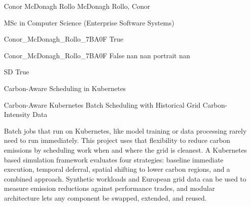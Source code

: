 
\begingroup{}\relax



\def\Key{Conor_McDonagh_Rollo_7BA0F}

{Conor McDonagh Rollo}
{McDonagh Rollo, Conor}

{MSc in Computer Science (Enterprise Software Systems)}

{Conor_McDonagh_Rollo_7BA0F}
{True}

{Conor_McDonagh_Rollo_7BA0F}
{False}
{nan}
{nan}
{portrait}
{nan}

{SD}
{True}

{Carbon-Aware Scheduling in Kubernetes}

{Carbon-Aware Kubernetes Batch Scheduling with Historical Grid Carbon-Intensity Data}

{Batch jobs that run on Kubernetes, like model training or data processing rarely need to run immediately. This project uses that flexibility to reduce carbon emissions by scheduling work when and where the grid is cleanest. A Kubernetes based simulation framework evaluates four strategies: baseline immediate execution, temporal deferral, spatial shifting to lower carbon regions, and a combined approach. Synthetic workloads and European grid data can be used to measure emission reductions against performance trades, and modular architecture lets any component be swapped, extended, and reused.}

